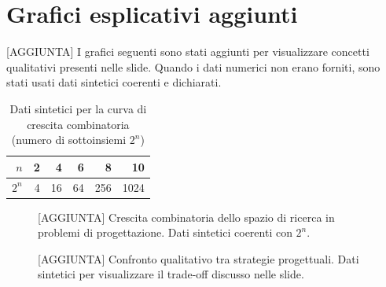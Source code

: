 \documentclass[11pt]{article}
\begin{document}
\section{Grafici esplicativi aggiunti}
[AGGIUNTA] I grafici seguenti sono stati aggiunti per visualizzare concetti qualitativi presenti nelle slide. Quando i dati numerici non erano forniti, sono stati usati dati sintetici coerenti e dichiarati.
\begin{table}[ht]
\centering
\caption{Dati sintetici per la curva di crescita combinatoria (numero di sottoinsiemi $2^n$)}
\label{tab:dati-sintetici-combinatoria}
\begin{tabular}{@{}rrrrrr@{}}
\toprule
$n$ & 2 & 4 & 6 & 8 & 10 \\
\midrule
$2^n$ & 4 & 16 & 64 & 256 & 1024 \\
\bottomrule
\end{tabular}
\end{table}
\begin{figure}[ht]
\centering
{}
\caption{[AGGIUNTA] Crescita combinatoria dello spazio di ricerca in problemi di progettazione. Dati sintetici coerenti con $2^n$.}
\label{fig:crescita-combinatoria}
\end{figure}
\begin{figure}[ht]
\centering
{}
\caption{[AGGIUNTA] Confronto qualitativo tra strategie progettuali. Dati sintetici per visualizzare il trade-off discusso nelle slide.}
\label{fig:confronto-strategie}
\end{figure}
\end{document}
